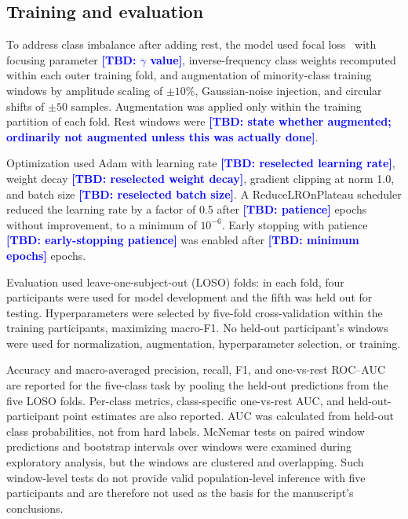 \documentclass[pdflatex,sn-nature,iicol]{sn-jnl}
\newcommand{\TBD}[1]{\textcolor{blue}{\textbf{[TBD: #1]}}}
\begin{document}
\subsection{Training and evaluation}

To address class imbalance after adding rest, the model used focal loss~\cite{lin2017focal} with focusing parameter \TBD{$\gamma$ value}, inverse-frequency class weights recomputed within each outer training fold, and augmentation of minority-class training windows by amplitude scaling of $\pm10\%$, Gaussian-noise injection, and circular shifts of $\pm50$ samples. Augmentation was applied only within the training partition of each fold. Rest windows were \TBD{state whether augmented; ordinarily not augmented unless this was actually done}.

Optimization used Adam with learning rate \TBD{reselected learning rate}, weight decay \TBD{reselected weight decay}, gradient clipping at norm 1.0, and batch size \TBD{reselected batch size}. A ReduceLROnPlateau scheduler reduced the learning rate by a factor of 0.5 after \TBD{patience} epochs without improvement, to a minimum of $10^{-6}$. Early stopping with patience \TBD{early-stopping patience} was enabled after \TBD{minimum epochs} epochs.

Evaluation used leave-one-subject-out (LOSO) folds: in each fold, four participants were used for model development and the fifth was held out for testing. Hyperparameters were selected by five-fold cross-validation within the training participants, maximizing macro-F1. No held-out participant's windows were used for normalization, augmentation, hyperparameter selection, or training.


Accuracy and macro-averaged precision, recall, F1, and one-vs-rest ROC--AUC are reported for the five-class task by pooling the held-out predictions from the five LOSO folds. Per-class metrics, class-specific one-vs-rest AUC, and held-out-participant point estimates are also reported. AUC was calculated from held-out class probabilities, not from hard labels. McNemar tests on paired window predictions and bootstrap intervals over windows were examined during exploratory analysis, but the windows are clustered and overlapping. Such window-level tests do not provide valid population-level inference with five participants and are therefore not used as the basis for the manuscript's conclusions.
\end{document}
